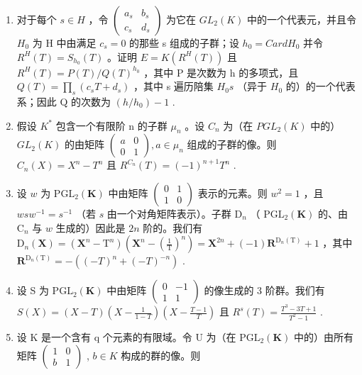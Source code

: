 \begin{enumerate}
\def\labelenumi{\alph{enumi})}
\setcounter{enumi}{1}
\item
  对于每个 \(s \in H\) ，令 \(\begin{pmatrix} a_{s} & b_{s} \\ c_{s} & d_{s} \end{pmatrix}\) 为它在 \(GL_{2}(K)\) 中的一个代表元，并且令 \(H_{0}\) 为 H 中由满足 \(c_{s} = 0\) 的那些 s 组成的子群；设 \(h_{0} = CardH_{0}\) 并令 \(R^{H}(T) = S_{h_{0}}(T)\) 。证明 \(E = K(R^{H}(T))\) 且 \(R^{H}(T) = P(T)/Q(T)^{h_{0}}\) ，其中 P 是次数为 h 的多项式，且 \(Q(T) = \prod_{s} (c_{s}T + d_{s})\) ，其中 s 遍历陪集 \(H_{0}s\) （异于 \(H_{0}\) 的）的一个代表系；因此 Q 的次数为 \((h/h_{0}) - 1\) .
\item
  假设 \(K^{*}\) 包含一个有限阶 n 的子群 \(\mu_{n}\) 。设 \(C_{n}\) 为（在 \(PGL_{2}(K)\) 中的）\(GL_{2}(K)\) 的由矩阵 \(\begin{pmatrix} a & 0 \\ 0 & 1 \end{pmatrix}, a \in \mu_{n}\) 组成的子群的像。则 \(C_{n}(X) = X^{n} - T^{n}\) 且 \(R^{C_{n}}(T) = (-1)^{n+1}T^{n}\) .
\item
  设 \(w\) 为 \(\mathrm{PGL}_2(\mathbf{K})\) 中由矩阵 \(\begin{pmatrix} 0 & 1 \\ 1 & 0 \end{pmatrix}\) 表示的元素。则 \(w^2 = 1\) ，且 \(wsw^{-1} = s^{-1}\) （若 \(s\) 由一个对角矩阵表示）。子群 \(\mathrm{D}_n\) （ \(\mathrm{PGL}_2(\mathbf{K})\) 的、由 \(\mathrm{C}_n\) 与 \(w\) 生成的）因此是 \(2n\) 阶的。我们有 \(\mathrm{D}_n(\mathbf{X}) = (\mathbf{X}^n - \mathrm{T}^n)\left(\mathbf{X}^n - \left(\frac{1}{\mathrm{T}}\right)^n\right) = \mathbf{X}^{2n} + (-1)\mathbf{R}^{\mathrm{D}_n(\mathrm{T})} + 1\) ，其中 \(\mathbf{R}^{\mathrm{D}_n(\mathrm{T})} = -((-T)^n + (-T)^{-n})\) .
\item
  设 S 为 \(\mathrm{PGL}_2(\mathbf{K})\) 中由矩阵 \(\left( \begin{array}{cc}0 & -1\\ 1 & 1 \end{array} \right)\) 的像生成的 3 阶群。我们有 \(S(X) = (X - T)\left(X - \frac{1}{1 - T}\right)\left(X - \frac{T - 1}{T}\right)\) 且 \(R^s (T) = \frac{T^3 - 3T + 1}{T^2 - 1}\) .
\item
  设 K 是一个含有 q 个元素的有限域。令 U 为（在 \(\mathrm{PGL}_{2}(\mathbf{K})\) 中的）由所有矩阵 \(\begin{pmatrix}1 & 0 \\ b & 1\end{pmatrix}\) , \(b \in K\) 构成的群的像。则
\end{enumerate}

